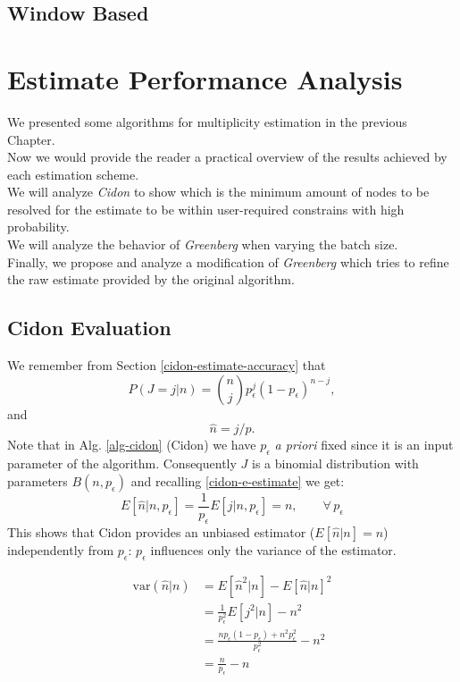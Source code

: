 \documentclass[12pt,a4paper]{report}
\newcommand{\pc}{p_{\epsilon}}
\begin{document}
\section{Window Based}
\chapter{Estimate Performance Analysis}
\label{ch:Performance Analysis}

We presented some algorithms for multiplicity estimation in the previous Chapter.\\ Now we would provide the reader a practical overview of the results achieved by each estimation scheme.\\
We will analyze \emph{Cidon} to show which is the minimum amount of nodes to be resolved for the estimate to be within user-required constrains with high probability.\\  
We will analyze the behavior of \emph{Greenberg} when varying the batch size.\\
Finally, we propose and analyze a modification of \emph{Greenberg} which tries to refine the raw estimate provided by the original algorithm.
\section{Cidon Evaluation}

\begin{equation*}
\end{equation*}
We remember from Section \ref{cidon-estimate-accuracy} that
\begin{equation*}P(J=j|n)={n \choose j}\pc^{j}(1-\pc)^{n-j},\end{equation*}
and
\begin{equation*}\hat{n}=j/p.\end{equation*}
Note that  in Alg. \ref{alg-cidon} (Cidon) we have $\pc$ \emph{a priori} fixed since it is an input parameter of the algorithm. Consequently $J$ is a binomial distribution with parameters $B(n,\pc)$ and recalling \eqref{cidon-e-estimate}
we get:
\begin{equation}
E[\hat{n}|n,\pc]=\frac{1}{\pc}E\left[j|n,\pc\right]=n, \qquad \forall \,\pc
\end{equation}
This shows that Cidon provides an unbiased estimator ($E[\hat{n}|n]=n$) independently from $\pc$: $\pc$ influences only the variance of the estimator. 

\begin{equation}
\begin{split}
\textrm{var}(\hat{n}|n) & =E[\hat{n}^{2}|n]- E[\hat{n}|n]^{2}\\
& = \frac{1}{\pc^{2}}E[j^{2}|n] - n^{2}\\
& = \frac{n\pc(1-\pc)+n^{2}\pc^{2}}{\pc^{2}}- n^{2}\\
& =  \frac{n}{\pc}-n
\end{split}
\end{equation}
\end{document}
